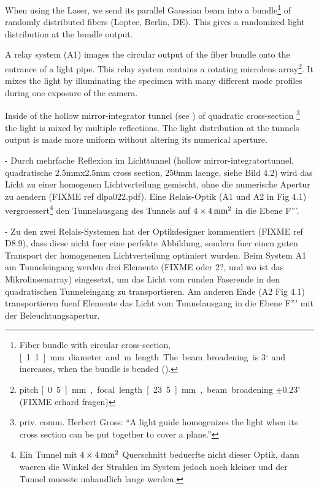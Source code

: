 When using the Laser, we send its parallel Gaussian beam into a
bundle\footnote{Fiber bundle with circular cross-section,
  \unit[1.1]{mm} diameter and \unit[2]{m} length. The beam broadening
  is $3{}^\circ$ and increases, when the bundle is bended
  (\cite{D8.4}).} of randomly distributed fibers (Loptec, Berlin,
DE). This gives a randomized light distribution at the bundle output.

A relay system (A1) images the circular output of the fiber bundle
onto the entrance of a light pipe. This relay system contains a
rotating microlens array\footnote{pitch \unit[0.5]{mm}, focal length
  \unit[23.5]{mm}, beam broadening $\pm 0.23^\circ$ (FIXME erhard
  fragen)}. It mixes the light by illuminating the specimen with many
different mode profiles during one exposure of the camera.

Inside of the hollow mirror-integrator tunnel (see
) of quadratic cross-section
\footnote{priv. comm.  Herbert Gross: ``A light guide homogenizes the
  light when its cross section can be put together to cover a plane.''}
the light is mixed by multiple reflections. The light distribution at
the tunnels output is made more uniform without altering its numerical
aperture.




 - Durch mehrfache Reflexion im Lichttunnel (hollow
   mirror-integratortunnel, quadratische 2.5mmx2.5mm cross section,  %
   250mm laenge, siehe Bild 4.2)  wird das Licht
   zu einer homogenen Lichtverteilung gemischt, ohne die numerische
   Apertur zu aendern (FIXME ref dlpa022.pdf).  Eine Relais-Optik (A1
   und A2 in Fig 4.1) vergroessert\footnote{Ein Tunnel mit $\unit[4\times4]{mm^2}$
   Querschnitt beduerfte nicht dieser Optik, dann waeren die Winkel
   der Strahlen im System jedoch noch kleiner und der Tunnel muesste
   unhandlich lange werden.} 
   den Tunnelausgang des Tunnels auf $\unit[4\times4]{mm^2}$
   in die Ebene F'''.




 - Zu den zwei Relais-Systemen hat der Optikdesigner kommentiert
   (FIXME ref D8.9), dass diese nicht fuer eine perfekte Abbildung,
   sondern fuer einen guten Transport der homogenenen Lichtverteilung    %
   optimiert wurden. Beim System A1 am Tunneleingang werden drei Elemente
   (FIXME oder 2?, und wo ist das Mikrolinsenarray) eingesetzt, um das
   Licht vom runden Faserende in den quadratischen Tunneleingang zu
   transportieren. Am anderen Ende (A2 Fig 4.1) transportieren fuenf Elemente das
   Licht vom Tunnelausgang in die Ebene F''' mit der
   Beleuchtungsapertur.

